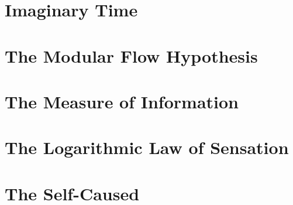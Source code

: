 \documentclass[11pt,a4paper,twoside]{book}
\begin{document}
\chapter{Imaginary Time}



\chapter{The Modular Flow Hypothesis}



\chapter{The Measure of Information}



\chapter{The Logarithmic Law of Sensation}



\chapter{The Self-Caused}






\appendix




\end{document}
